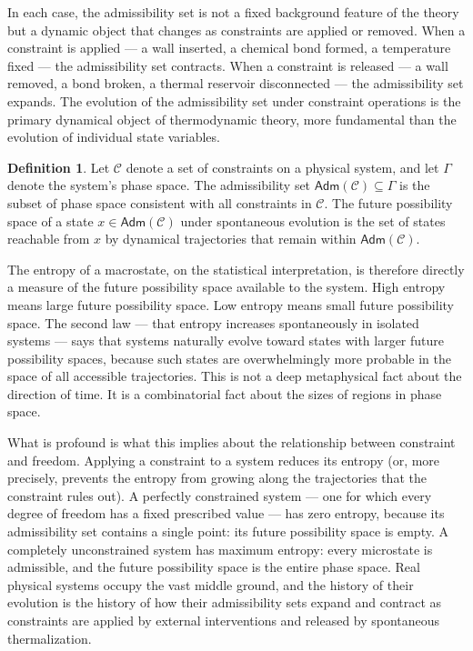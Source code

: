 \documentclass[12pt,openany]{book}
\theoremstyle{plain}
\theoremstyle{definition}
\newtheorem{definition}[theorem]{Definition}
\theoremstyle{remark}
\newcommand{\sadm}{\mathsf{Adm}}
\begin{document}
In each case, the admissibility set is not a fixed background feature of the theory but a dynamic object that changes as constraints are applied or removed. When a constraint is applied — a wall inserted, a chemical bond formed, a temperature fixed — the admissibility set contracts. When a constraint is released — a wall removed, a bond broken, a thermal reservoir disconnected — the admissibility set expands. The evolution of the admissibility set under constraint operations is the primary dynamical object of thermodynamic theory, more fundamental than the evolution of individual state variables.

\begin{definition}
Let $\mathcal{C}$ denote a set of constraints on a physical system, and let $\Gamma$ denote the system's phase space. The admissibility set $\sadm(\mathcal{C}) \subseteq \Gamma$ is the subset of phase space consistent with all constraints in $\mathcal{C}$. The future possibility space of a state $x \in \sadm(\mathcal{C})$ under spontaneous evolution is the set of states reachable from $x$ by dynamical trajectories that remain within $\sadm(\mathcal{C})$.
\end{definition}

The entropy of a macrostate, on the statistical interpretation, is therefore directly a measure of the future possibility space available to the system. High entropy means large future possibility space. Low entropy means small future possibility space. The second law — that entropy increases spontaneously in isolated systems — says that systems naturally evolve toward states with larger future possibility spaces, because such states are overwhelmingly more probable in the space of all accessible trajectories. This is not a deep metaphysical fact about the direction of time. It is a combinatorial fact about the sizes of regions in phase space.

What is profound is what this implies about the relationship between constraint and freedom. Applying a constraint to a system reduces its entropy (or, more precisely, prevents the entropy from growing along the trajectories that the constraint rules out). A perfectly constrained system — one for which every degree of freedom has a fixed prescribed value — has zero entropy, because its admissibility set contains a single point: its future possibility space is empty. A completely unconstrained system has maximum entropy: every microstate is admissible, and the future possibility space is the entire phase space. Real physical systems occupy the vast middle ground, and the history of their evolution is the history of how their admissibility sets expand and contract as constraints are applied by external interventions and released by spontaneous thermalization.
\end{document}

